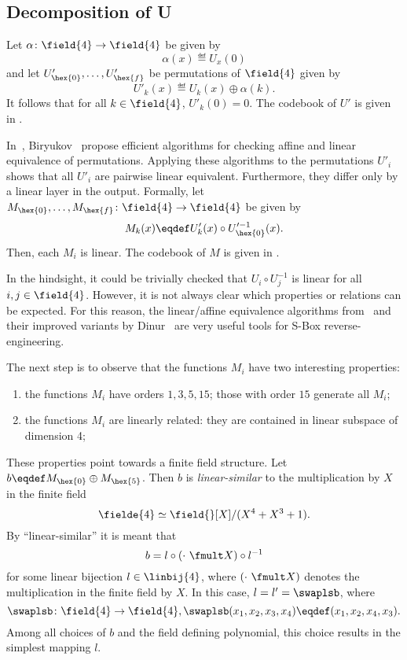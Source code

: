 \subsection{Decomposition of U}

Let $\alpha\colon \field{4} \to \field{4}$ be given by
$$
\alpha(x) \eqdef U_{x}(0)
$$
and let $U'_{\hex{0}},\ldots,U'_{\hex{f}}$ be permutations of $\field{4}$ given by
$$
U'_k(x) \eqdef U_k(x) \oplus \alpha(k).
$$
It follows that for all $k \in \field{4}$, $U'_k(0) = 0$. The codebook of $U'$ is given in .


In~\cite{LinAffEQ}, Biryukov~\etal{} propose efficient algorithms for checking affine and linear equivalence of permutations. Applying these algorithms to the permutations $U'_i$ shows that all $U'_i$ are pairwise linear equivalent. Furthermore, they differ only by a linear layer in the output. Formally, let $M_{\hex{0}}, \ldots, M_{\hex{f}}\colon \field{4} \to \field{4}$ be given by
$$
M_k(x) \eqdef U'_k(x) \circ U'^{-1}_{\hex{0}}(x).
$$
Then, each $M_i$ is linear. The codebook of $M$ is given in .

\begin{remark}
In the hindsight, it could be trivially checked that $U_i \circ U_j^{-1}$ is linear for all $i,j \in \field{4}$. However, it is not always clear which properties or relations can be expected. For this reason, the linear/affine equivalence algorithms from~\cite{LinAffEQ} and their improved variants by Dinur~\cite{LinAffEQ2} are very useful tools for S-Box reverse-engineering.
\end{remark}

The next step is to observe that the functions $M_i$ have two interesting properties:
\begin{enumerate}
    \item the functions $M_i$ have orders $1,3,5,15$; those with order $15$ generate all $M_i$;
    \item the functions $M_i$ are linearly related: they are contained in linear subspace of dimension 4;
\end{enumerate}
These properties point towards a finite field structure. Let $b \eqdef M_{\hex{0}} \oplus M_{\hex{5}}$. Then $b$ is \emph{linear-similar} to the multiplication by $X$ in the finite field
$$
\fielde{4} \simeq \field{}[X]/(X^4 + X^3 + 1).
$$
By ``linear-similar'' it is meant that
$$
b = l \circ (\cdot~\fmult X) \circ l^{-1}
$$
for some linear bijection $l \in \linbij{4}$, where $(\cdot~\fmult X)$ denotes the multiplication in the finite field by $X$. In this case, $l = l' = \swaplsb$, where
$$
\swaplsb\colon \field{4} \to \field{4}, \swaplsb(x_1,x_2,x_3,x_4) \eqdef (x_1,x_2,x_4,x_3).
$$
Among all choices of $b$ and the field defining polynomial, this choice results in the simplest mapping $l$.

